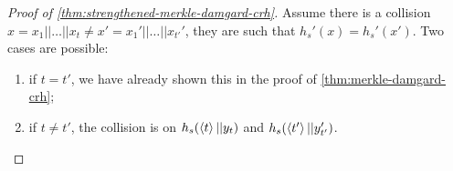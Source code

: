 \begin{proof}[Proof of \cref{thm:strengthened-merkle-damgard-crh}]
	Assume there is a collision $x = x_1 || \dots || x_t \neq x' = x_1' || \dots || x_{t'}'$, \ie they are such that $h_s'(x) = h_s'(x')$.
	Two cases are possible:
	\begin{enumerate}
		\item if $t = t'$, we have already shown this in the proof of \cref{thm:merkle-damgard-crh};
		\item if $t \neq t'$, the collision is on $h_s(\left< {t} \right> || y_t)$ and $h_s(\left< {t'} \right> || y_{t'}')$. \qedhere
	\end{enumerate}
\end{proof}
